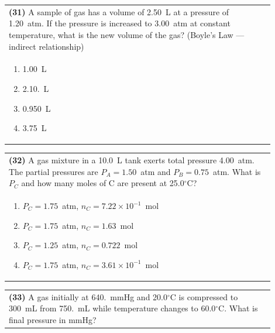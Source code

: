 \documentclass{article}
\begin{document}
{{\vspace{0.2cm}
\noindent\begin{tabular}{|p{0.9\linewidth}|}
\hline
\textbf{(31)} A sample of gas has a volume of 2.50~L at a pressure of 1.20~atm. If the pressure is increased to 3.00~atm at constant temperature, what is the new volume of the gas? (Boyle’s Law — indirect relationship)\\[0.2cm]

\begin{minipage}[t]{0.85\linewidth}
\begin{enumerate}[label=\alph*.]
\item 1.00~L
\item 2.10.~L
\item 0.950~L
\item 3.75~L
\end{enumerate}
\end{minipage}\\[0.2cm]
\hline
\end{tabular}

\vspace{0.2cm}
\noindent\begin{tabular}{|p{0.9\linewidth}|}
\hline
\textbf{(32)} A gas mixture in a 10.0~L tank exerts total pressure 4.00~atm. The partial pressures are $P_A=1.50$~atm and $P_B=0.75$~atm. What is $P_C$ and how many moles of C are present at 25.0$^\circ$C?\\[0.2cm]

\begin{minipage}[t]{0.85\linewidth}
\begin{enumerate}[label=\alph*.]
\item $P_C=1.75$~atm, $n_C=7.22\times10^{-1}$~mol
\item $P_C=1.75$~atm, $n_C=1.63$~mol
\item $P_C=1.25$~atm, $n_C=0.722$~mol
\item $P_C=1.75$~atm, $n_C=3.61\times10^{-1}$~mol
\end{enumerate}
\end{minipage}\\[0.2cm]
\hline
\end{tabular}

\newpage

\noindent\begin{tabular}{|p{0.9\linewidth}|}
\hline
\textbf{(33)} A gas initially at 640.~mmHg and 20.0$^\circ$C is compressed to 300~mL from 750.~mL while temperature changes to 60.0$^\circ$C. What is final pressure in mmHg?\\[0.2cm]


\end{tabular}}}
\end{document}
